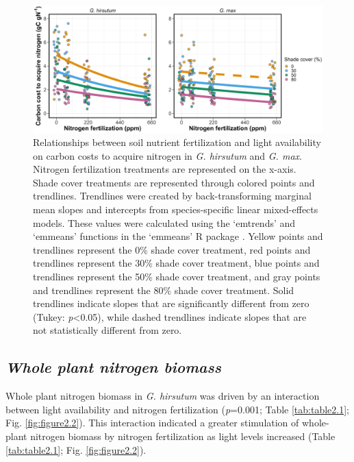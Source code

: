 \newpage
\begin{landscape}
\begin{figure}
    \includegraphics[width=\columnwidth]{ch2_LxN_Greenhouse/figs/fig1_ncost.jpg}
    \centering
    \caption[Relationships between soil nitrogen fertilization and light availability on carbon costs to acquire nitrogen in \textit{G. hirsutum} and \textit{G. max}]{Relationships between soil nutrient fertilization and light availability on carbon costs to acquire nitrogen in \textit{G. hirsutum} and \textit{G. max}. Nitrogen fertilization treatments are represented on the x-axis. Shade cover treatments are represented through colored points and trendlines. Trendlines were created by back-transforming marginal mean slopes and intercepts from species-specific linear mixed-effects models. These values were calculated using the ‘emtrends’ and ‘emmeans’ functions in the ‘emmeans’ R package . Yellow points and trendlines represent the 0\% shade cover treatment, red points and trendlines represent the 30\% shade cover treatment, blue points and trendlines represent the 50\% shade cover treatment, and gray points and trendlines represent the 80\% shade cover treatment. Solid trendlines indicate slopes that are significantly different from zero (Tukey: \textit{p}<0.05), while dashed trendlines indicate slopes that are not statistically different from zero.}
    \label{fig:figure2.1}
\end{figure}
\end{landscape}
\clearpage

\newpage
\subsection{\textit{Whole plant nitrogen biomass}}
\noindent Whole plant nitrogen biomass in \textit{G. hirsutum} was driven by an interaction between light availability and nitrogen fertilization (\textit{p}=0.001; Table \ref{tab:table2.1}; Fig. \ref{fig:figure2.2}). This interaction indicated a greater stimulation of whole-plant nitrogen biomass by nitrogen fertilization as light levels increased (Table \ref{tab:table2.1}; Fig. \ref{fig:figure2.2}).

